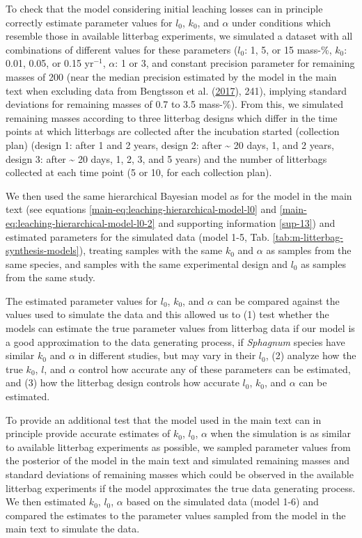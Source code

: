 \documentclass[
  12pt,
]{article}
\begin{document}
To check that the model considering initial leaching losses can in principle correctly estimate parameter values for \(l_0\), \(k_0\), and \(\alpha\) under conditions which resemble those in available litterbag experiments, we simulated a dataset with all combinations of different values for these parameters (\(l_0\): 1, 5, or 15 mass-\%, \(k_0\): 0.01, 0.05, or 0.15 yr\(^{-1}\), \(\alpha\): 1 or 3, and constant precision parameter for remaining masses of 200 (near the median precision estimated by the model in the main text when excluding data from Bengtsson et al. (\protect\hyperlink{ref-Bengtsson.2017}{2017}), 241), implying standard deviations for remaining masses of 0.7 to 3.5 mass-\%). From this, we simulated remaining masses according to three litterbag designs which differ in the time points at which litterbags are collected after the incubation started (collection plan) (design 1: after 1 and 2 years, design 2: after \textasciitilde{} 20 days, 1, and 2 years, design 3: after \textasciitilde{} 20 days, 1, 2, 3, and 5 years) and the number of litterbags collected at each time point (5 or 10, for each collection plan).

We then used the same hierarchical Bayesian model as for the model in the main text (see equations \ref{main-eq:leaching-hierarchical-model-l0} and \ref{main-eq:leaching-hierarchical-model-l0-2} and supporting information \ref{sup-13}) and estimated parameters for the simulated data (model 1-5, Tab. \ref{tab:m-litterbag-synthesis-models}), treating samples with the same \(k_0\) and \(\alpha\) as samples from the same species, and samples with the same experimental design and \(l_0\) as samples from the same study.

The estimated parameter values for \(l_0\), \(k_0\), and \(\alpha\) can be compared against the values used to simulate the data and this allowed us to (1) test whether the models can estimate the true parameter values from litterbag data if our model is a good approximation to the data generating process, if \emph{Sphagnum} species have similar \(k_0\) and \(\alpha\) in different studies, but may vary in their \(l_0\), (2) analyze how the true \(k_0\), \(l\), and \(\alpha\) control how accurate any of these parameters can be estimated, and (3) how the litterbag design controls how accurate \(l_0\), \(k_0\), and \(\alpha\) can be estimated.

To provide an additional test that the model used in the main text can in principle provide accurate estimates of \(k_0\), \(l_0\), \(\alpha\) when the simulation is as similar to available litterbag experiments as possible, we sampled parameter values from the posterior of the model in the main text and simulated remaining masses and standard deviations of remaining masses which could be observed in the available litterbag experiments if the model approximates the true data generating process. We then estimated \(k_0\), \(l_0\), \(\alpha\) based on the simulated data (model 1-6) and compared the estimates to the parameter values sampled from the model in the main text to simulate the data.
\end{document}
